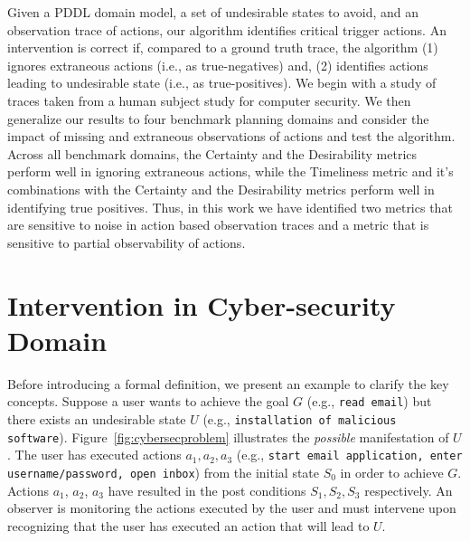 Given a PDDL domain model, a set of undesirable states to avoid, and an observation trace of actions, our algorithm identifies critical trigger actions. An intervention is correct if, compared to a ground truth trace, the algorithm (1) ignores extraneous actions (i.e., as true-negatives) and, (2)
identifies actions leading to undesirable state (i.e., as true-positives). We begin with a study of traces taken from a human subject study for computer security. We then generalize our results to four benchmark planning domains and
consider the impact of missing and extraneous observations of actions and test the algorithm. 
Across all benchmark domains, the Certainty and the Desirability metrics perform well in ignoring extraneous actions, while the Timeliness metric and
it's combinations with the Certainty and the Desirability metrics perform well in identifying true positives. Thus, in this work we have identified two metrics that are sensitive to noise in action based observation traces and a metric that is sensitive to partial observability of actions.



\section{Intervention in Cyber-security Domain}
Before introducing a formal definition, we present an example to clarify the key concepts. 
Suppose a user wants to  achieve the goal $G$ (e.g., \texttt{read email}) but there exists an undesirable state $U$ (e.g., \texttt{installation of malicious software}). 
Figure~\ref{fig:cybersecproblem} illustrates the \emph{possible} manifestation of $U$. 
The user has executed actions $a_1, a_2, a_3$ (e.g., \texttt{start email application, enter username/password, open inbox}) from the initial state $S_0$ in order to achieve  $G$.
Actions $a_1$, $a_2$, $a_3$ have resulted in the post conditions $S_{1}, S_{2}, S_3$ respectively. 
An observer is monitoring the actions executed by the user and must intervene upon recognizing that the user has executed an action that will lead to $U$.

